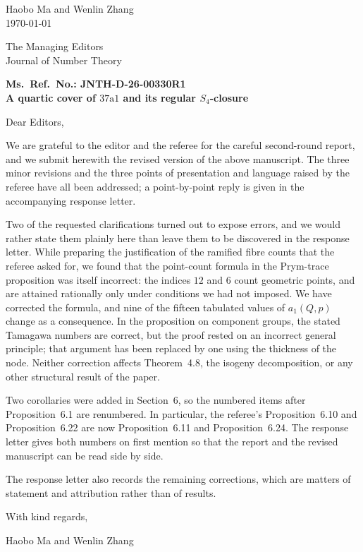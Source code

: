 \documentclass[11pt,letterpaper]{article}
\begin{document}
\thispagestyle{empty}

\noindent
Haobo Ma and Wenlin Zhang\\
\today

\vspace{1.5em}

\noindent
The Managing Editors\\
Journal of Number Theory

\vspace{1.5em}

\noindent
\textbf{Ms.\ Ref.\ No.: JNTH-D-26-00330R1}\\
\textbf{A quartic cover of \(37\mathrm{a}1\) and its regular \(S_4\)-closure}

\vspace{1.5em}

\noindent
Dear Editors,

\vspace{0.8em}

\noindent
We are grateful to the editor and the referee for the careful second-round report, and we
submit herewith the revised version of the above manuscript. The three minor revisions and
the three points of presentation and language raised by the referee have all been addressed;
a point-by-point reply is given in the accompanying response letter.

\vspace{0.8em}

\noindent
Two of the requested clarifications turned out to expose errors, and we would rather state
them plainly here than leave them to be discovered in the response letter. While preparing
the justification of the ramified fibre counts that the referee asked for, we found that the
point-count formula in the Prym-trace proposition was itself incorrect: the indices \(12\)
and \(6\) count geometric points, and are attained rationally only under conditions we had
not imposed. We have corrected the formula, and nine of the fifteen tabulated values of
\(a_1(Q,p)\) change as a consequence. In the proposition on component groups, the stated
Tamagawa numbers are correct, but the proof rested on an incorrect general principle; that
argument has been replaced by one using the thickness of the node. Neither correction
affects Theorem~4.8, the isogeny decomposition, or any other structural result of the paper.

\vspace{0.8em}

\noindent
Two corollaries were added in Section~6, so the numbered items after Proposition~6.1 are
renumbered. In particular, the referee's Proposition~6.10 and Proposition~6.22 are now
Proposition~6.11 and Proposition~6.24. The response letter gives both numbers on first
mention so that the report and the revised manuscript can be read side by side.

\vspace{0.8em}

\noindent
The response letter also records the remaining corrections, which are matters of statement
and attribution rather than of results.

\vspace{1.5em}

\noindent
With kind regards,

\vspace{1.5em}

\noindent
Haobo Ma and Wenlin Zhang
\end{document}
